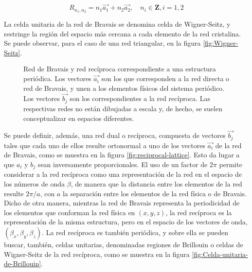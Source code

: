 \begin{equation}
R_{n_1,n_2} = n_1 \vec{a_1} + n_2 \vec{a_2}, \quad n_i \in \textbf{Z}, i={1,2}
\end{equation}

La celda unitaria de la red de Bravais se denomina celda de Wigner-Seitz, y restringe la región del espacio más cercana a cada elemento de la red cristalina. Se puede observar, para el caso de una red triangular, en la figura \ref{fig:Wigner-Seitz}.

\begin{figure}[H]
	\centering 
	\hspace{0pt}
	\caption{Red de Bravais y red recíproca correspondiente a una estructura periódica. Los vectores $\vec{a_i}$ son los que corresponden a la red directa o red de Bravais, y unen a los elementos físicos del sistema periódico. Los vectores $\vec{b_j}$ son los correspondientes a la red recíproca. Las respectivas redes no están dibujadas a escala y, de hecho, se suelen conceptualizar en espacios diferentes.}
	\label{fig:direct-and-reciprocal-lattice}
\end{figure}

Se puede definir, además, una red dual o recíproca, compuesta de vectores $\vec{b_j}$ tales que cada uno de ellos resulte ortonormal a uno de los vectores $\vec{a_i}$ de la red de Bravais, como se muestra en la figura \ref{fig:reciprocal-lattice}. Esto da lugar a que $a_i$ y $b_j$ sean inversamente proporcionales. El uso de un factor de $2\pi$ permite considerar a la red recíproca como una representación de la red en el espacio de los números de onda $\beta$, de manera que la distancia entre los elementos de la red resulte $2\pi/a$, con $a$ la separación entre los elementos de la red física o de Bravais. Dicho de otra manera, mientras la red de Bravais representa la periodicidad de los elementos que conforman la red física en $(x,y,z)$, la red recíproca es la representación de la misma estructura, pero en el espacio de los vectores de onda, $(\beta_x, \beta_y, \beta_z)$. La red recíproca es también periódica, y sobre ella se pueden buscar, también, celdas unitarias, denominadas regiones de Brillouin o celdas de Wigner-Seitz de la red recíproca, como se muestra en la figura \ref{fig:Celda-unitaria-de-Brillouin}.


